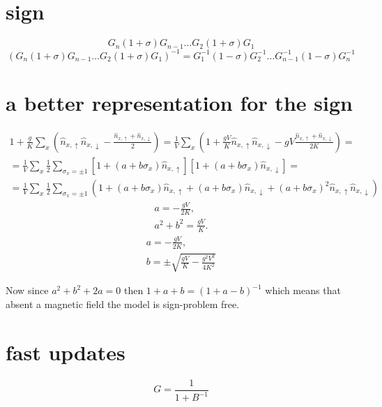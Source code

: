 \documentclass[onecolumn,english,prl,showpacs]{revtex4}
\newcommand{\Up}{{\uparrow}}
\newcommand{\Dn}{{\downarrow}}
\begin{document}
\section{sign}
\begin{equation}
 G_n(1+\sigma)G_{n-1}\ldots G_{2}(1+\sigma)G_1
\end{equation}
\begin{equation}
 (G_n(1+\sigma)G_{n-1}\ldots G_{2}(1+\sigma)G_1)^{-1} = G_1^{-1}(1-\sigma)G_{2}^{-1}\ldots G_{n-1}^{-1}(1-\sigma)G_n^{-1}
\end{equation}

\section{a better representation for the sign}

\begin{multline}
 1+\frac{g}{K} \sum_x (\hat{n}_{x, \Up} \hat{n}_{x,\Dn}-\frac{\hat{n}_{x, \Up}+\hat{n}_{x,\Dn}}{2}) = \frac{1}{V}\sum_x \left(1+\frac{gV}{K}\hat{n}_{x, \Up} \hat{n}_{x,\Dn}-gV\frac{\hat{n}_{x, \Up}+\hat{n}_{x,\Dn}}{2K}\right)=\\=
 \frac{1}{V}\sum_x \frac12 \sum_{\sigma_x=\pm1} \left[1+(a+b\sigma_x)\hat{n}_{x, \Up}\right]\left[1+(a+b\sigma_x) \hat{n}_{x,\Dn}\right]=\\=
 \frac{1}{V}\sum_x \frac12 \sum_{\sigma_x=\pm1} \left(1+(a+b\sigma_x)\hat{n}_{x, \Up}+(a+b\sigma_x) \hat{n}_{x,\Dn} + (a+b\sigma_x)^2\hat{n}_{x, \Up} \hat{n}_{x,\Dn} \right)
\end{multline}
\begin{eqnarray}
 a = -\frac{gV}{2K},\\
 a^2+b^2 = \frac{gV}{K}.
\end{eqnarray}
\begin{eqnarray}
 a = -\frac{gV}{2K},\\
 b = \pm\sqrt{\frac{gV}{K}-\frac{g^2V^2}{4K^2}}
\end{eqnarray}

Now since $a^2+b^2+2a=0$ then $1+a+b = (1+a-b)^{-1}$ which means that absent a magnetic field the model is sign-problem free.

\section{fast updates}

\begin{equation}
 G = \frac{1}{1+B^{-1}}
\end{equation}
\end{document}
